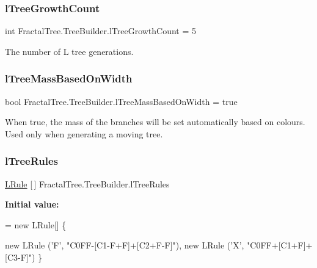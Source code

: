 \subsubsection{\texorpdfstring{l\+Tree\+Growth\+Count}{lTreeGrowthCount}}
{\footnotesize\ttfamily int Fractal\+Tree.\+Tree\+Builder.\+l\+Tree\+Growth\+Count = 5}



The number of L tree generations. 

\hypertarget{class_fractal_tree_1_1_tree_builder_a4ba732b60fd74e4db9f5422a7e9ffd82}{}\label{class_fractal_tree_1_1_tree_builder_a4ba732b60fd74e4db9f5422a7e9ffd82} 
\subsubsection{\texorpdfstring{l\+Tree\+Mass\+Based\+On\+Width}{lTreeMassBasedOnWidth}}
{\footnotesize\ttfamily bool Fractal\+Tree.\+Tree\+Builder.\+l\+Tree\+Mass\+Based\+On\+Width = true}



When true, the mass of the branches will be set automatically based on colours. Used only when generating a moving tree. 

\hypertarget{class_fractal_tree_1_1_tree_builder_a725a1ff0ebe0fbbc78e22eedea80a50e}{}\label{class_fractal_tree_1_1_tree_builder_a725a1ff0ebe0fbbc78e22eedea80a50e} 
\subsubsection{\texorpdfstring{l\+Tree\+Rules}{lTreeRules}}
{\footnotesize\ttfamily \hyperlink{class_fractal_tree_1_1_l_rule}{L\+Rule} \mbox{[}$\,$\mbox{]} Fractal\+Tree.\+Tree\+Builder.\+l\+Tree\+Rules}

{\bfseries Initial value\+:}
\begin{DoxyCode}
= \textcolor{keyword}{new} LRule[] \{
            
            
            
            
            

            \textcolor{keyword}{new} LRule (\textcolor{charliteral}{'F'}, \textcolor{stringliteral}{"C0FF-[C1-F+F]+[C2+F-F]"}),
            \textcolor{keyword}{new} LRule (\textcolor{charliteral}{'X'}, \textcolor{stringliteral}{"C0FF+[C1+F]+[C3-F]"})
        \}
\end{DoxyCode}


